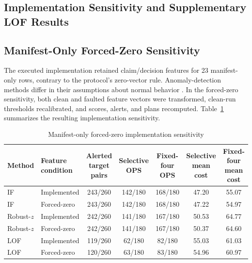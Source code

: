 \documentclass[sn-basic]{sn-jnl}%
\theoremstyle{thmstyleone}%
\theoremstyle{thmstyletwo}%
\theoremstyle{thmstylethree}%
\begin{document}
\begin{appendices}

\renewcommand*{\theHtable}{appendix.\Alph{section}.\arabic{table}}

\section{Implementation Sensitivity and Supplementary LOF Results}\label{app:a}

\setcounter{table}{0}

\subsection{Manifest-Only Forced-Zero Sensitivity}\label{app:a-1}

The executed implementation retained claim/decision features for 23 manifest-only rows, contrary to the protocol's zero-vector rule. Anomaly-detection methods differ in their assumptions about normal behavior \citep{chandola2009}. In the forced-zero sensitivity, both clean and faulted feature vectors were transformed, clean-run thresholds recalibrated, and scores, alerts, and plans recomputed. Table~\ref{tab:app-a1} summarizes the resulting implementation sensitivity.

\begin{table}[htbp]
\centering
\caption{Manifest-only forced-zero implementation sensitivity}
\label{tab:app-a1}
\small
\setlength{\tabcolsep}{3pt}
\renewcommand{\arraystretch}{1.1}
\begin{tabular*}{\linewidth}{@{\extracolsep{\fill}}llccccc@{}}
\toprule
Method & \shortstack{Feature\\condition} & \shortstack{Alerted\\target pairs} & \shortstack{Selective\\OPS} & \shortstack{Fixed-four\\OPS} & \shortstack{Selective\\mean cost} & \shortstack{Fixed-four\\mean cost} \\
\midrule
IF & Implemented & 243/260 & 142/180 & 168/180 & 47.20 & 55.07 \\
IF & Forced-zero & 243/260 & 142/180 & 168/180 & 47.22 & 54.97 \\
\addlinespace
Robust-\(z\) & Implemented & 242/260 & 141/180 & 167/180 & 50.53 & 64.77 \\
Robust-\(z\) & Forced-zero & 242/260 & 141/180 & 167/180 & 50.37 & 64.60 \\
\addlinespace
LOF & Implemented & 119/260 & 62/180 & 82/180 & 55.03 & 61.03 \\
LOF & Forced-zero & 120/260 & 63/180 & 83/180 & 54.96 & 60.97 \\
\bottomrule
\end{tabular*}
\end{table}


\end{appendices}
\end{document}
